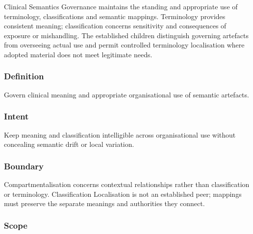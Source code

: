 Clinical Semantics Governance maintains the standing and appropriate use of terminology, classifications and semantic mappings. Terminology provides consistent meaning; classification concerns sensitivity and consequences of exposure or mishandling. The established children distinguish governing artefacts from overseeing actual use and permit controlled terminology localisation where adopted material does not meet legitimate needs.

\subsubsection*{Definition}

Govern clinical meaning and appropriate organisational use of semantic artefacts.

\subsubsection*{Intent}

Keep meaning and classification intelligible across organisational use without concealing semantic drift or local variation.

\subsubsection*{Boundary}

Compartmentalisation concerns contextual relationships rather than classification or terminology. Classification Localisation is not an established peer; mappings must preserve the separate meanings and authorities they connect.

\subsubsection*{Scope}
